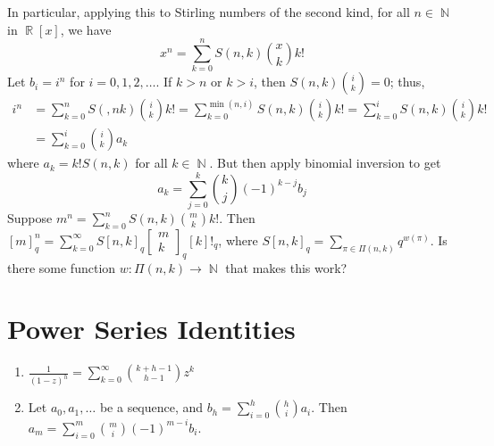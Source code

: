 \documentclass[11pt, a4paper]{memoir}
\DeclareMathOperator{\N}{{\mathbb{N}}}
\DeclareMathOperator{\R}{{\mathbb{R}}}
\theoremstyle{change}
\theoremstyle{plain}
\theoremstyle{nonumberplain}
\newcommand{\sqbinom}[2]{\begin{bmatrix}#1\\#2\end{bmatrix}}
\numberwithin{equation}{section}
\begin{document}
In particular, applying this to Stirling numbers of the second kind, for all $n\in\N$ in $\R[x]$, we have
\begin{equation*}
    x^n=\sum_{k=0}^n S(n,k)\binom{x}{k}k!
\end{equation*}
Let $b_i=i^n$ for $i=0,1,2,\ldots$.
If $k>n$ or $k>i$, then $S(n,k)\binom{i}{k}=0$; thus,
\begin{align*}
    i^n &= \sum_{k=0}^nS(,nk)\binom{i}{k}k! = \sum_{k=0}^{\min(n,i)}S(n,k)\binom{i}{k}k!=\sum_{k=0}^i S(n,k)\binom{i}{k}k!\\
        &= \sum_{k=0}^i\binom{i}{k}a_k
\end{align*}
where $a_k=k!S(n,k)$ for all $k\in\N$.
But then apply binomial inversion to get
\begin{equation*}
    a_k=\sum_{j=0}^k\binom{k}{j}(-1)^{k-j}b_j
\end{equation*}
Suppose $m^n=\sum_{k=0}^n S(n,k)\binom{m}{k}k!$.
Then $[m]_q^n=\sum_{k=0}^\infty S[n,k]_q\sqbinom{m}{k}_q[k]!_q$, where $S[n,k]_q=\sum_{\pi\in\Pi(n,k)}q^{w(\pi)}$.
Is there some function $w:\Pi(n,k)\to\N$ that makes this work?
\chapter{Power Series Identities}
\begin{enumerate}[nl,r]
    \item $\displaystyle\frac{1}{(1-z)^h}=\sum_{k=0}^\infty\binom{k+h-1}{h-1}z^k$
    \item Let $a_0,a_1,\ldots$ be a sequence, and $b_h=\sum_{i=0}^h\binom{h}{i}a_i$.
        Then $a_m=\sum_{i=0}^m\binom{m}{i}(-1)^{m-i}b_i$.
\end{enumerate}
\end{document}
